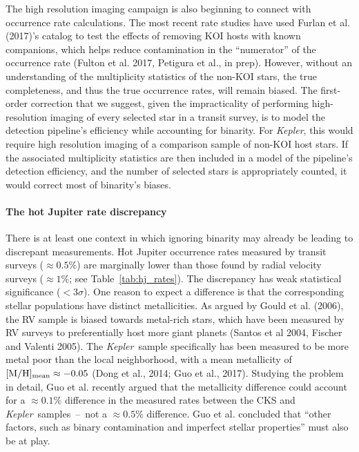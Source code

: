The high resolution imaging campaign is also beginning to connect with
occurrence rate calculations.
The most recent rate studies have used Furlan et al. (2017)'s 
catalog to test the effects of removing KOI hosts with known companions, which 
helps reduce contamination in the ``numerator'' of 
the occurrence rate (Fulton et al. 2017, Petigura et al., in prep).
However, without an understanding of the multiplicity statistics of the 
non-KOI stars, the true completeness, and thus the true 
occurrence rates, will remain biased.
The first-order correction that we suggest, given the impracticality of 
performing high-resolution imaging of every selected star in a transit survey,
is to model the detection pipeline's efficiency while accounting for 
binarity.
For {\it Kepler}, this would require high resolution imaging of a
comparison sample of non-KOI host stars. If the associated multiplicity 
statistics are then included in a model of the pipeline's detection 
efficiency, and the number of selected stars is appropriately counted, it 
would correct most of binarity's biases.


\paragraph{The hot Jupiter rate discrepancy}
There is at least one context in which ignoring binarity may already be 
leading to discrepant measurements.
Hot Jupiter occurrence rates measured by transit surveys ($\approx 0.5\%$) are 
marginally lower than those found by radial velocity surveys ($\approx 1\%$; 
see Table~\ref{tab:hj_rates}).
The discrepancy has weak statistical significance ($<3\sigma$).
One reason to expect a difference is that the corresponding stellar 
populations have distinct metallicities.
As argued by Gould et al. (2006), the RV sample is biased towards 
metal-rich stars, which have been measured by RV surveys to preferentially 
host more giant planets (Santos et al 2004, Fischer and Valenti 2005).
The {\it Kepler}\ sample specifically has been measured to be more metal poor 
than the local neighborhood, with a mean metallicity of $[{\rm M/H}]_{\rm 
    mean}\approx -0.05$ (Dong et al., 2014; Guo et al., 2017).
Studying the problem in detail, Guo et al. recently argued that the 
metallicity difference could account for a $\approx 0.1\%$ difference in the 
measured rates between the CKS and {\it Kepler}\ samples~--~not a $\approx 
0.5\%$ difference.
Guo et al. concluded that ``other factors, such as binary contamination and 
imperfect stellar properties'' must also be at play.

